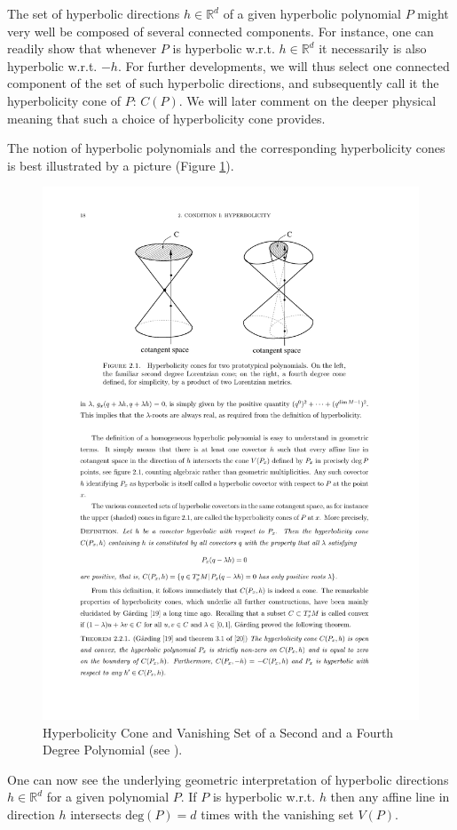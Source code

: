 The set of hyperbolic directions $h\in \mathbb{R}^d$ of a given hyperbolic polynomial $P$ might very well be composed of several connected components. For instance, one can readily show that whenever $P$ is hyperbolic w.r.t. $h\in \mathbb{R}^d$ it necessarily is also hyperbolic w.r.t. $-h$. For further developments, we will thus select one connected component of the set of such hyperbolic directions, and subsequently call it the hyperbolicity cone of $P$: $C(P)$. We will later comment on the deeper physical meaning that such a choice of hyperbolicity cone provides.

The notion of hyperbolic polynomials and the corresponding hyperbolicity cones is best illustrated by a picture (Figure \ref{hyperbol}). 
\begin{figure}[hbt!]
    \centering
    \includegraphics[width=\textwidth]{Poly.pdf}
    \caption{Hyperbolicity Cone and Vanishing Set of a Second and a Fourth Degree Polynomial (see \cite{Rivera}).}
    \label{hyperbol}
\end{figure}
One can now see the underlying geometric interpretation of  hyperbolic directions  $h\in \mathbb{R}^d$ for a given polynomial $P$. If $P$ is hyperbolic w.r.t. $h$ then any affine line in direction $h$ intersects $\mathrm{deg}(P) = d$ times with the vanishing set $V(P)$.

